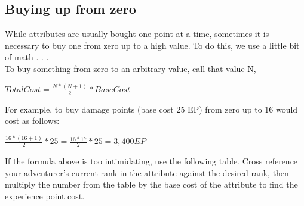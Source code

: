 \begin{multicols*}{2}
\subsection{Buying up from zero}
While attributes are usually bought one point at a time, sometimes it is necessary to buy one from zero up to a high value. To do this, we use a little bit of math . . .\\
To buy something from zero to an arbitrary value, call that value N,
\begin{tcolorbox}[breakable,boxrule=0pt,title=\textbf{Attribute Purchase Equation}]
$Total Cost = \frac{N * (N+1)}{2} * Base Cost$
\end{tcolorbox}
For example, to buy damage points (base cost 25 EP) from zero up to 16 would cost as follows:
\begin{tcolorbox}[breakable,boxrule=0pt,title=\textbf{Attribute Purchase Example}]
$\frac{16 * (16+1)}{2} * 25 = \frac{16*17}{2} * 25 = 3,400 EP$
\end{tcolorbox}
If the formula above is too intimidating, use the following table. Cross reference your adventurer's current rank in the attribute against the desired rank, then multiply the number from the table by the base cost of the attribute to find the experience point cost.
\end{multicols*}
